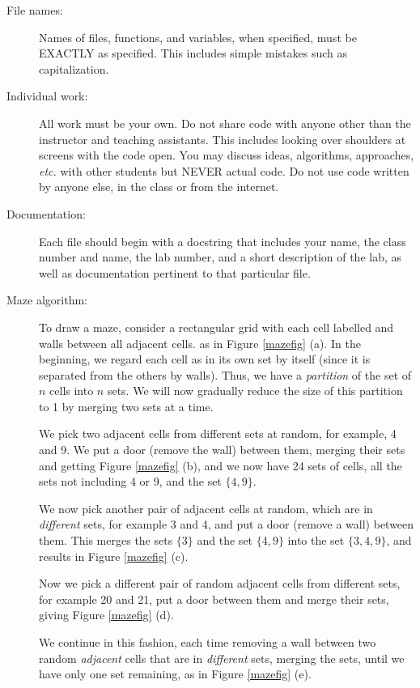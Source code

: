 \documentclass{article}
\newcommand{\set}[1]{\ensuremath{\{#1\}}}
\begin{document}
\begin{description}

\item[File names:]  Names of files, functions, and variables, 
when specified,
must be EXACTLY as specified.  This includes simple mistakes such
as capitalization.

\item[Individual work:]  All work must be your own.  Do not share
code with anyone other than the instructor and teaching assistants.
This includes looking over shoulders at screens with the code open.
You may discuss ideas, algorithms, approaches, {\em etc.} with
other students but NEVER actual code.  Do not use code
written by anyone else, in the class or from the internet.

\item[Documentation:] Each file should begin with a docstring
that includes your name, the class number and name, the lab
number, and  
a short description of the lab, as well as documentation pertinent
to that particular file.

  
\item[Maze algorithm:] To draw a maze, consider a rectangular grid
  with each cell labelled and walls between all adjacent cells. as in
  Figure \ref{mazefig} (a).  In the beginning, we regard each cell as
  in its own set by itself (since it is separated from the others by
  walls).  Thus, we have a {\em partition} of the set of $n$ cells
  into $n$ sets.  We will now gradually reduce the size of this
  partition to 1 by merging two sets at a time.

  We pick two adjacent cells from different sets at random, for
  example, 4 and 9.  We put a door (remove the wall) between them,
  merging their sets and getting Figure \ref{mazefig} (b), and we now
  have 24 sets of cells, all the sets not including 4 or 9, and the
  set \set{4,9}.

  We now pick another pair of adjacent cells at random, which are in
  {\em different} sets, for example 3 and 4, and put a door (remove a
  wall) between them.  This merges the sets \set{3} and the set
  \set{4,9} into the set \set{3,4,9}, and results in Figure
  \ref{mazefig} (c).


  Now we pick a different pair of random adjacent cells from different
  sets, for example 20 and 21, put a door between them and merge their
  sets, giving Figure
  \ref{mazefig} (d).


  We continue in this fashion, each time removing a wall between two
  random {\em adjacent} cells that are in {\em different} sets,
  merging the sets,  until
  we have only one set remaining, as in Figure \ref{mazefig} (e).  



\end{description}
\end{document}
